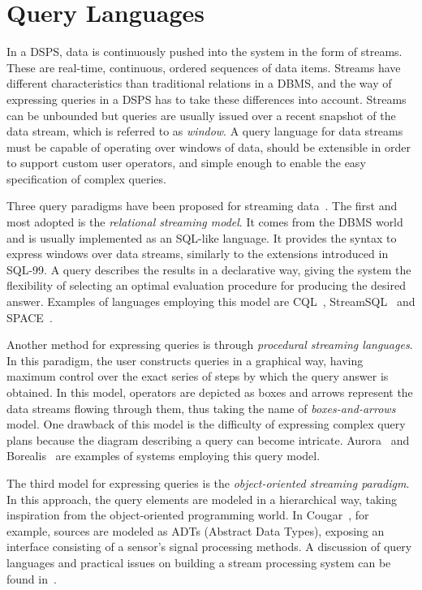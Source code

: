 \section{Query Languages}
\label{sec:querymod}

In a DSPS, data is continuously pushed into the system in the form of streams. These are real-time,
continuous, ordered sequences of data items. Streams have different characteristics than traditional
relations in a DBMS, and the way of expressing queries in a DSPS has to take these differences into
account. Streams can be unbounded but queries are usually issued over a recent snapshot of the data
stream, which is referred to as \textit{window}. A query language for data streams must be capable of
operating over windows of data, should be extensible in order to support custom user operators, and
simple enough to enable the easy specification of complex queries. 

Three query paradigms have been proposed for streaming data~\cite{dsm-issues}. The first and
most adopted is the \textit{relational streaming model}. It comes from the DBMS world and is
usually implemented as an SQL-like language. It provides the syntax to express windows over data streams,
similarly to the extensions introduced in SQL-99. A query describes the results in a declarative way,
giving the system the flexibility of selecting an optimal evaluation procedure for producing the desired
answer. Examples of languages employing this model are CQL~\cite{cql}, StreamSQL~\cite{streamsql} and
SPACE~\cite{ss-spade}. 

Another method for expressing queries is through \textit{procedural streaming languages}. In this
paradigm, the user constructs queries in a graphical way, having maximum control over the exact series of
steps by which the query answer is obtained. In this model, operators are depicted as boxes and arrows
represent the data streams flowing through them, thus taking the name of \textit{boxes-and-arrows} model.
One drawback of this model is the difficulty of expressing complex query plans because the diagram
describing a query can become intricate. Aurora~\cite{aurora} and Borealis~\cite{borealis-design} are
examples of systems employing this query model.

The third model for expressing queries is the \textit{object-oriented streaming paradigm}. In this
approach, the query elements are modeled in a hierarchical way, taking inspiration from the
object-oriented programming world. In Cougar~\cite{cougar-adt}, for example, sources are modeled as ADTs
(Abstract Data Types), exposing an interface consisting of a sensor's signal processing methods. A discussion of
query languages and practical issues on building a stream processing system can be found
in~\cite{design-principles}.

